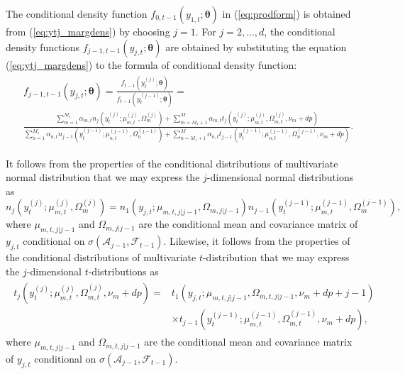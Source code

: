 \documentclass[nojss]{jss}
\begin{document}
\begin{appendix}
The conditional density function $f_{0,t-1}(y_{1,t};\boldsymbol{\theta})$ in (\ref{eq:prodform}) is obtained from (\ref{eq:ytj_margdens}) by choosing $j=1$.  For $j=2,...,d$,  the conditional density functions  $f_{j-1,t-1}(y_{j,t};\boldsymbol{\theta})$ are obtained by substituting the equation (\ref{eq:ytj_margdens}) to the formula of conditional density function:
\begin{align}\label{eq:conddens_gstmvar}
\begin{aligned}
&f_{j-1,t-1}\left(y_{j,t};\boldsymbol{\theta}\right) = \frac{f_{t-1}(y_{t}^{(j)};\boldsymbol{\theta})}{f_{t-1}(y_{t}^{(j-1)};\boldsymbol{\theta})} = \\
&\frac{\sum_{m=1}^{M_1}\alpha_{m,t} n_j(y_{t}^{(j)};\mu_{m,t}^{(j)},\Omega_{m}^{(j)}) + \sum_{m=M_1+1}^{M}\alpha_{m,t} t_j(y_{t}^{(j)};\mu_{m,t}^{(j)},\Omega_{m,t}^{(j)}, \nu_m+dp)}{\sum_{n=1}^{M_1}\alpha_{n,t} n_{j-1}(y_{t}^{(j-1)};\mu_{n,t}^{(j-1)},\Omega_n^{(j-1)}) + \sum_{n=M_1+1}^{M}\alpha_{n,t} t_{j-1}(y_{t}^{(j-1)};\mu_{n,t}^{(j-1)},\Omega_n^{(j-1)},\nu_m + dp)}.
\end{aligned}
\end{align}

It follows from the properties of the conditional distributions of multivariate normal distribution that we may express the $j$-dimensional normal distributions as
\begin{equation}\label{eq:n1_nj-1}
n_j(y_{t}^{(j)};\mu_{m,t}^{(j)},\Omega_m^{(j)}) = n_1(y_{j,t};\mu_{m,t,j|j-1},\Omega_{m,j|j-1}) n_{j-1}(y_{t}^{(j-1)};\mu_{m,t}^{(j-1)},\Omega_m^{(j-1)}),
\end{equation}
where $\mu_{m,t,j|j-1}$ and $\Omega_{m,j|j-1}$ are the conditional mean and covariance matrix of $y_{j,t}$ conditional on $\sigma(\mathcal{A}_{j-1},\mathcal{F}_{t-1})$.  Likewise, it follows from the properties of the conditional distributions of multivariate $t$-distribution that we may express the $j$-dimensional $t$-distributions as
\begin{align}\label{eq:t1_tj-1}
\begin{aligned}
t_j(y_{t}^{(j)};\mu_{m,t}^{(j)},\Omega_{m,t}^{(j)},\nu_m + dp) =& t_1(y_{j,t};\mu_{m,t,j|j-1},\Omega_{m,t,j|j-1},\nu_m + dp + j  - 1) \\
&\times t_{j-1}(y_{t}^{(j-1)};\mu_{m,t}^{(j-1)},\Omega_{m,t}^{(j-1)},\nu_m + dp),
\end{aligned}
\end{align}
where $\mu_{m,t,j|j-1}$ and $\Omega_{m,t,j|j-1}$ are the conditional mean and covariance matrix of $y_{j,t}$ conditional on $\sigma(\mathcal{A}_{j-1},\mathcal{F}_{t-1})$.


\end{appendix}
\end{document}
